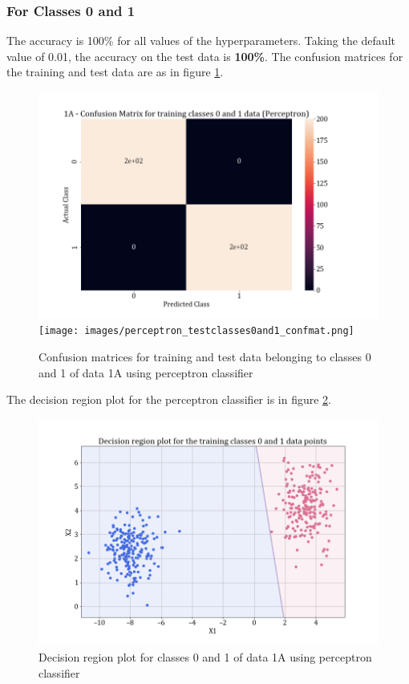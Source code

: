 \documentclass[11pt,a4paper]{article}
\begin{document}
\subsubsection{For Classes 0 and 1}

The accuracy is 100\% for all values of the hyperparameters. Taking the default value of 0.01, the accuracy on the test data is \textbf{100\%}. The confusion matrices for the training and test data are as in figure \ref{fig:perc_conf_01}.
\begin{figure}[H]
    \centering
    \includegraphics[scale=0.27]{images/perceptron_training classes 0 and 1_confmat.png}
    \texttt{[image: images/perceptron\_testclasses0and1\_confmat.png]}
    \caption{Confusion matrices for training and test data belonging to classes 0 and 1 of data 1A using perceptron classifier}
    \label{fig:perc_conf_01}
\end{figure}
The decision region plot for the perceptron classifier is in figure \ref{fig:perc_dec_reg_01}.
\begin{figure}[H]
    \centering
    \includegraphics[scale = 0.35]{images/training classes 0 and 1dec_reg_perceptron.png}
    \caption{Decision region plot for classes 0 and 1 of data 1A using perceptron classifier}
    \label{fig:perc_dec_reg_01}
\end{figure}
\end{document}
